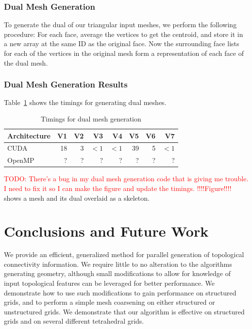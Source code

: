 \documentclass[journal]{vgtc}                %
\begin{document}
\subsubsection{Dual Mesh Generation}
To generate the dual of our triangular input meshes, we perform the following procedure: For each face, average the vertices to get the centroid, and store it in a new array at the same ID as the original face. Now the surrounding face lists for each of the vertices in the original mesh form a representation of each face of the dual mesh.

\subsubsection{Dual Mesh Generation Results}
Table~\ref{tab:timingsdualmesh} shows the timings for generating dual meshes.

\begin{table}[h!]
\begin{center}
\begin{tabular}{l r r r r r r r}
Architecture & V1 & V2 & V3 & V4 & V5 & V6 & V7\\
\hline
CUDA & 18 & 3 & $<1$ & $<1$ & 39 & 5 & $<1$ \\
OpenMP & ? & ? & ? & ? & ? & ? & ? \\
\end{tabular}
\caption{Timings for dual mesh generation}
\label{tab:timingsdualmesh}
\end{center}
\end{table}
\textcolor{red}{TODO: There's a bug in my dual mesh generation code that is giving me trouble. I need to fix it so I can make the figure and update the timings.}
\textcolor{red}{!!!!Figure!!!!} shows a mesh and its dual overlaid as a skeleton.

\section{Conclusions and Future Work}
We provide an efficient, generalized method for parallel generation of topological connectivity information. We require little to no alteration to the algorithms generating geometry, although small modifications to allow for knowledge of input topological features can be leveraged for better performance. We demonstrate how to use such modifications to gain performance on structured grids, and to perform a simple mesh coarsening on either structured or unstructured grids. We demonstrate that our algorithm is effective on structured grids and on several different tetrahedral grids. 
\end{document}
